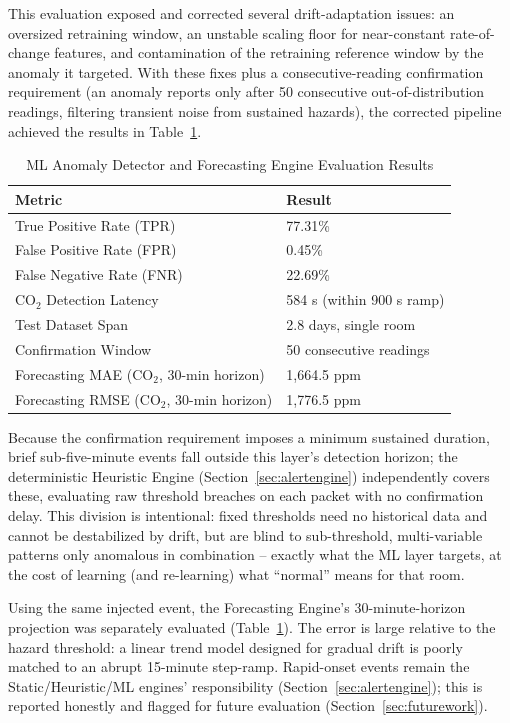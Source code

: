 \documentclass[conference]{IEEEtran}
\begin{document}
This evaluation exposed and corrected several drift-adaptation issues: an oversized retraining window, an unstable scaling floor for near-constant rate-of-change features, and contamination of the retraining reference window by the anomaly it targeted. With these fixes plus a consecutive-reading confirmation requirement (an anomaly reports only after 50 consecutive out-of-distribution readings, filtering transient noise from sustained hazards), the corrected pipeline achieved the results in Table~\ref{tab:mlresults}.

\begin{table}[h]
\centering
\caption{ML Anomaly Detector and Forecasting Engine Evaluation Results}
\label{tab:mlresults}
{\footnotesize\setlength{\tabcolsep}{3pt}
\begin{tabular}{|l|l|}
\hline
\textbf{Metric} & \textbf{Result} \\ \hline
True Positive Rate (TPR) & 77.31\% \\ \hline
False Positive Rate (FPR) & 0.45\% \\ \hline
False Negative Rate (FNR) & 22.69\% \\ \hline
CO$_2$ Detection Latency & 584 s (within 900 s ramp) \\ \hline
Test Dataset Span & 2.8 days, single room \\ \hline
Confirmation Window & 50 consecutive readings \\ \hline
Forecasting MAE (CO$_2$, 30-min horizon) & 1,664.5 ppm \\ \hline
Forecasting RMSE (CO$_2$, 30-min horizon) & 1,776.5 ppm \\ \hline
\end{tabular}}
\end{table}

Because the confirmation requirement imposes a minimum sustained duration, brief sub-five-minute events fall outside this layer's detection horizon; the deterministic Heuristic Engine (Section~\ref{sec:alertengine}) independently covers these, evaluating raw threshold breaches on each packet with no confirmation delay. This division is intentional: fixed thresholds need no historical data and cannot be destabilized by drift, but are blind to sub-threshold, multi-variable patterns only anomalous in combination -- exactly what the ML layer targets, at the cost of learning (and re-learning) what ``normal'' means for that room.

Using the same injected event, the Forecasting Engine's 30-minute-horizon projection was separately evaluated (Table~\ref{tab:mlresults}). The error is large relative to the hazard threshold: a linear trend model designed for gradual drift is poorly matched to an abrupt 15-minute step-ramp. Rapid-onset events remain the Static/Heuristic/ML engines' responsibility (Section~\ref{sec:alertengine}); this is reported honestly and flagged for future evaluation (Section~\ref{sec:futurework}).
\end{document}
